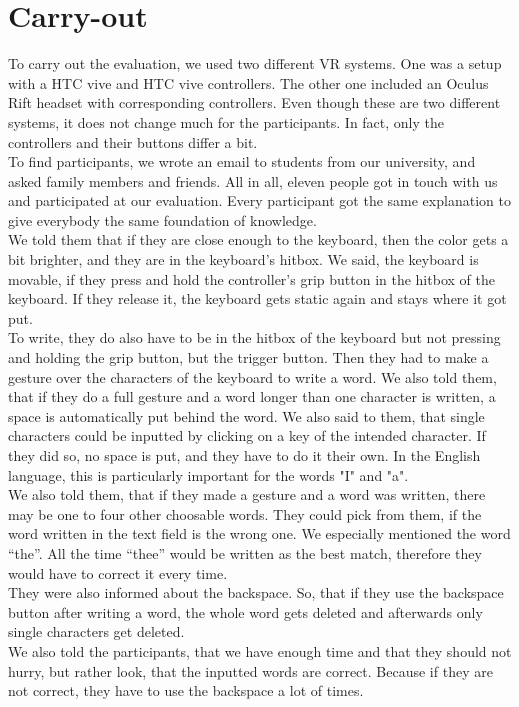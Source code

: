 \section{Carry-out}
To carry out the evaluation, we used two different VR systems. One was a setup with a HTC vive and HTC vive controllers. The other one included an Oculus Rift headset with corresponding controllers. Even though these are two different systems, it does not change much for the participants. In fact, only the controllers and their buttons differ a bit.\\
To find participants, we wrote an email to students from our university, and asked family members and friends. All in all, eleven people got in touch with us and participated at our evaluation. Every participant got the same explanation to give everybody the same foundation of knowledge.\\
We told them that if they are close enough to the keyboard, then the color gets a bit brighter, and they are in the keyboard's hitbox. We said, the keyboard is movable, if they press and hold the controller's grip button in the hitbox of the keyboard. If they release it, the keyboard gets static again and stays where it got put.\\
To write, they do also have to be in the hitbox of the keyboard but not pressing and holding the grip button, but the trigger button. Then they had to make a gesture over the characters of the keyboard to write a word. We also told them, that if they do a full gesture and a word longer than one character is written, a space is automatically put behind the word. We also said to them, that single characters could be inputted by clicking on a key of the intended character. If they did so, no space is put, and they have to do it their own. In the English language, this is particularly important for the words "I" and "a".\\
We also told them, that if they made a gesture and a word was written, there may be one to four other choosable words. They could pick from them, if the word written in the text field is the wrong one. We especially mentioned the word ``the''. All the time ``thee'' would be written as the best match, therefore they would have to correct it every time.\\
They were also informed about the backspace. So, that if they use the backspace button after writing a word, the whole word gets deleted and afterwards only single characters get deleted.\\
We also told the participants, that we have enough time and that they should not hurry, but rather look, that the inputted words are correct. Because if they are not correct, they have to use the backspace a lot of times.

